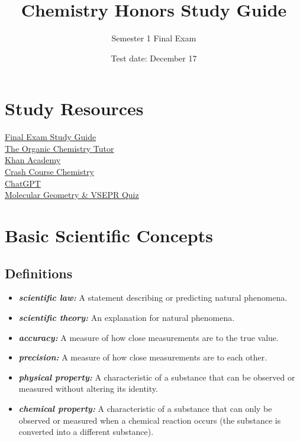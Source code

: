 \documentclass[a4paper, 12pt]{article}
\title{Chemistry Honors Study Guide}
\author{Semester 1 Final Exam}
\date{Test date: December 17}
\begin{document}
\maketitle

\tableofcontents

\newpage

\section{Study Resources}

\href{https://schoology.santacatalina.org/course/7352977547/materials/gp/7623195638}{Final Exam Study Guide}
\\
\href{https://www.youtube.com/c/TheOrganicChemistryTutor?app=desktop}{The Organic Chemistry Tutor}
\\
\href{https://www.youtube.com/@khanacademy}{Khan Academy}
\\
\href{https://www.youtube.com/watch?v=uVFCOfSuPTo&list=PL8dPuuaLjXtPHzzYuWy6fYEaX9mQQ8oGr}{Crash Course Chemistry}
\\
\href{https://chatgpt.com/}{ChatGPT}
\\
\href{https://chemquiz.net/geo/}{Molecular Geometry \& VSEPR Quiz}

\section{Basic Scientific Concepts}

\subsection{Definitions}

\begin{itemize}[leftmargin=*, nosep]
    \item \textbf{\textit{scientific law:}} A statement describing or predicting natural phenomena.
    \item \textbf{\textit{scientific theory:}} An explanation for natural phenomena.
    \item \textbf{\textit{accuracy:}} A measure of how close measurements are to the true value.
    \item \textbf{\textit{precision:}} A measure of how close measurements are to each other.
    \item \textbf{\textit{physical property:}} A characteristic of a substance that can be observed or measured without altering its identity.
    \item \textbf{\textit{chemical property:}} A characteristic of a substance that can only be observed or measured when a chemical reaction occurs (the substance is converted into a different substance). 
\end{itemize}
\end{document}
